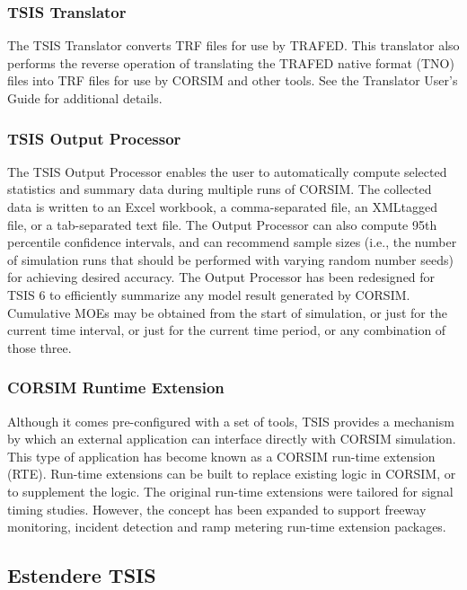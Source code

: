 \subsubsection{TSIS Translator}

The TSIS Translator converts TRF files for use by TRAFED. This translator also performs the reverse operation of
translating the TRAFED native format (TNO) files into TRF files for use by CORSIM and other tools. See the
Translator User's Guide for additional details.

\subsubsection{TSIS Output Processor}

The TSIS Output Processor enables the user to automatically compute selected statistics and summary data during
multiple runs of CORSIM. The collected data is written to an Excel workbook, a comma-separated file, an XMLtagged
file, or a tab-separated text file. The Output Processor can also compute 95th percentile confidence intervals,
and can recommend sample sizes (i.e., the number of simulation runs that should be performed with varying random
number seeds) for achieving desired accuracy. The Output Processor has been redesigned for TSIS 6 to efficiently
summarize any model result generated by CORSIM. Cumulative MOEs may be obtained from the start of
simulation, or just for the current time interval, or just for the current time period, or any combination of those three.

\subsubsection{CORSIM Runtime Extension}

Although it comes pre-configured with a set of tools, TSIS provides a mechanism by which an external application
can interface directly with CORSIM simulation. This type of application has become known as a CORSIM run-time
extension (RTE). Run-time extensions can be built to replace existing logic in CORSIM, or to supplement the
logic. The original run-time extensions were tailored for signal timing studies. However, the concept has been
expanded to support freeway monitoring, incident detection and ramp metering run-time extension packages.

\subsection{Estendere TSIS}


